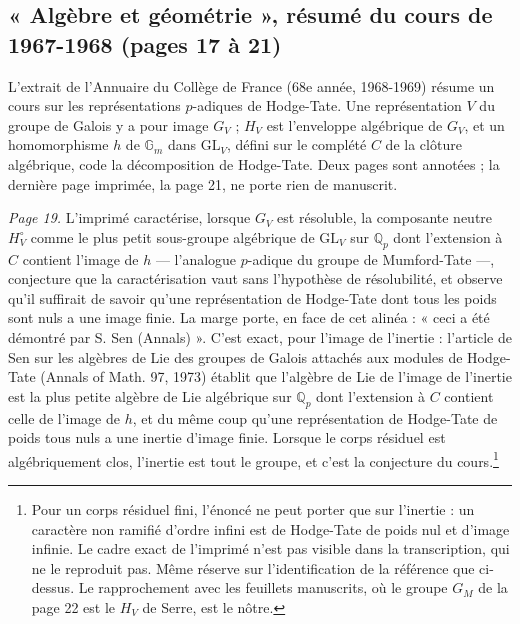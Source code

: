 \documentclass[11pt,a4paper]{article}
\begin{document}
\subsection*{« Algèbre et géométrie », résumé du cours de 1967-1968 (pages 17 à 21)}

L'extrait de l'Annuaire du Collège de France (68e année, 1968-1969) résume un
cours sur les représentations $p$-adiques de Hodge-Tate. Une représentation
$V$ du groupe de Galois y a pour image $G_V$ ; $H_V$ est l'enveloppe
algébrique de $G_V$, et un homomorphisme $h$ de $\mathbb{G}_m$ dans
$\mathrm{GL}_V$, défini sur le complété $C$ de la clôture algébrique, code la
décomposition de Hodge-Tate. Deux pages sont annotées ; la dernière page
imprimée, la page 21, ne porte rien de manuscrit.

\emph{Page 19.} L'imprimé caractérise, lorsque $G_V$ est résoluble, la
composante neutre $H_V^{\circ}$ comme le plus petit sous-groupe algébrique de
$\mathrm{GL}_V$ sur $\mathbb{Q}_p$ dont l'extension à $C$ contient l'image de
$h$ --- l'analogue $p$-adique du groupe de Mumford-Tate ---, conjecture que la
caractérisation vaut sans l'hypothèse de résolubilité, et observe qu'il
suffirait de savoir qu'une représentation de Hodge-Tate dont tous les poids
sont nuls a une image finie. La marge porte, en face de cet alinéa : « ceci a
été démontré par S. Sen (Annals) ». C'est exact, pour l'image de l'inertie :
l'article de Sen sur les algèbres de Lie des groupes de Galois attachés aux
modules de Hodge-Tate (Annals of Math. 97, 1973) établit que l'algèbre de Lie
de l'image de l'inertie est la plus petite algèbre de Lie algébrique sur
$\mathbb{Q}_p$ dont l'extension à $C$ contient celle de l'image de $h$, et du
même coup qu'une représentation de Hodge-Tate de poids tous nuls a une inertie
d'image finie. Lorsque le corps résiduel est algébriquement clos, l'inertie
est tout le groupe, et c'est la conjecture du cours.\footnote{Pour un corps
résiduel fini, l'énoncé ne peut porter que sur l'inertie : un caractère non
ramifié d'ordre infini est de Hodge-Tate de poids nul et d'image infinie. Le
cadre exact de l'imprimé n'est pas visible dans la transcription, qui ne le
reproduit pas. Même réserve sur l'identification de la référence que
ci-dessus. Le rapprochement avec les feuillets manuscrits, où le groupe $G_M$
de la page 22 est le $H_V$ de Serre, est le nôtre.}
\end{document}
